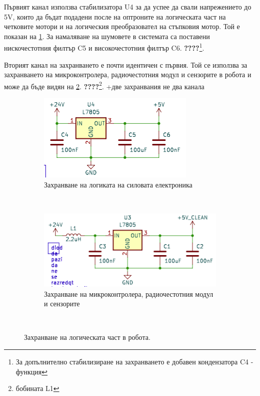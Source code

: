 Първият канал използва стабилизатора U4 за да успее да свали напрежението до 5V, които да бъдат подадени после на оптроните на логическата част на четковите мотори и на логическия преобразовател на стъпковия мотор. Той е показан на \cref{fig:power-5V}. За намаляване на шумовете в системата са поставени нискочестотния филтър C5 и високочестотния филтър C6. \textbf{????}\footnote{За допълнително стабилизиране на захранването е добавен кондензатора C4 - функция}. 

Вторият канал на захранването е почти идентичен с първия. Той се използва за захранването на микроконтролера, радиочестотния модул и сензорите в робота и може да бъде видян на \cref{fig:power-5V-clean}. \textbf{????}\footnote{бобината L1}.
+две захранвания не два канала
\begin{figure}[H] 
    \centering
    \begin{subfigure}[h]{0.6\textwidth}
        \includegraphics[width=\textwidth]{images/power-5V.png}
        \caption{Захранване на логиката на силовата електроника}
        \label{fig:power-5V}
    \end{subfigure}
    \\ %
    \begin{subfigure}[h]{0.75\textwidth}
        \includegraphics[width=\textwidth]{images/power-5V-clean.png}
        \caption{Захранване на микроконтролера, радиочестотния модул и сензорите}
        \label{fig:power-5V-clean}
    \end{subfigure}
    ~ %
    \caption{Захранване на логическата част в робота.}
    \label{fig:power-low}
\end{figure}

